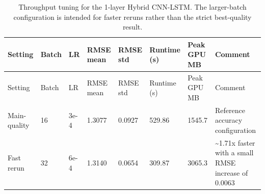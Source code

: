 \documentclass[11pt]{article}
\begin{document}
\begin{longtable}{p{2.1cm}p{1.3cm}p{1.4cm}p{1.2cm}p{1.2cm}p{1.6cm}p{1.8cm}p{4.5cm}}
\caption{Throughput tuning for the 1-layer Hybrid CNN-LSTM. The larger-batch configuration is intended for faster reruns rather than the strict best-quality result.}\label{tab:t5}\\
\toprule
Setting & Batch & LR & RMSE mean & RMSE std & Runtime (s) & Peak GPU MB & Comment \\
\midrule
\endfirsthead
\toprule
Setting & Batch & LR & RMSE mean & RMSE std & Runtime (s) & Peak GPU MB & Comment \\
\midrule
\endhead
Main-quality & 16 & 3e-4 & 1.3077 & 0.0927 & 529.86 & 1545.7 & Reference accuracy configuration \\
Fast rerun & 32 & 6e-4 & 1.3140 & 0.0654 & 309.87 & 3065.3 & \textasciitilde{}1.71x faster with a small RMSE increase of 0.0063 \\
\bottomrule
\end{longtable}
\end{document}
